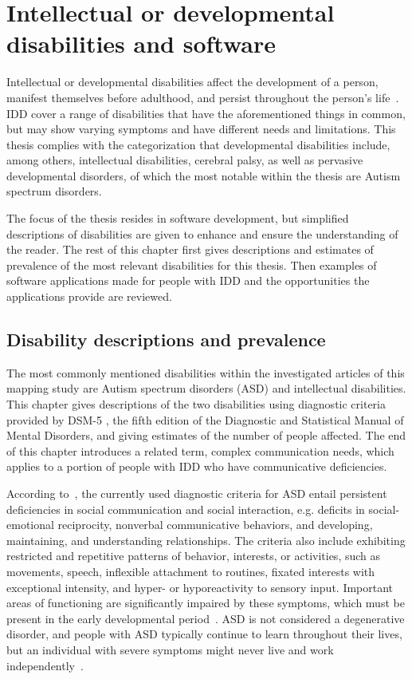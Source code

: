 \documentclass[utf8,english]{gradu3}
\begin{document}
\chapter{Intellectual or developmental disabilities and software}

Intellectual or developmental disabilities affect the development of a person,
manifest themselves before adulthood, and persist throughout the person's life~\parencite[e.g.][]{dsm5}.
IDD cover a range of disabilities that have the aforementioned things in common,
but may show varying symptoms and have different needs and limitations.
This thesis complies with the categorization that developmental disabilities include,
among others, intellectual disabilities, cerebral palsy, as well as pervasive developmental disorders,
of which the most notable within the thesis are Autism spectrum disorders.

The focus of the thesis resides in software development, but simplified descriptions
of disabilities are given to enhance and ensure the understanding of the reader.
The rest of this chapter first gives descriptions and estimates of prevalence
of the most relevant disabilities for this thesis.
Then examples of software applications made for people with IDD and the opportunities
the applications provide are reviewed.


\section{Disability descriptions and prevalence}

The most commonly mentioned disabilities within the investigated articles of this mapping study
are Autism spectrum disorders (ASD) and intellectual disabilities.
This chapter gives descriptions of the two disabilities
using diagnostic criteria provided by DSM-5 \parencite{dsm5},
the fifth edition of the Diagnostic and Statistical Manual of Mental Disorders,
and giving estimates of the number of people affected.
The end of this chapter introduces a related term, complex communication needs,
which applies to a portion of people with IDD who have communicative deficiencies.

According to~\textcite{dsm5}, the currently used diagnostic criteria for ASD entail
persistent deficiencies in social communication and social interaction, e.g. deficits in social-emotional reciprocity,
nonverbal communicative behaviors, and developing, maintaining, and understanding relationships.
The criteria also include exhibiting restricted and repetitive patterns of behavior, interests, or activities,
such as movements, speech, inflexible attachment to routines,
fixated interests with exceptional intensity, and hyper- or hyporeactivity to sensory input.
Important areas of functioning are significantly impaired by these symptoms,
which must be present in the early developmental period~\parencite{dsm5}.
ASD is not considered a degenerative disorder, and people with ASD typically
continue to learn throughout their lives, but an individual  with severe symptoms
might never live and work independently~\parencite{dsm5}.
\end{document}
